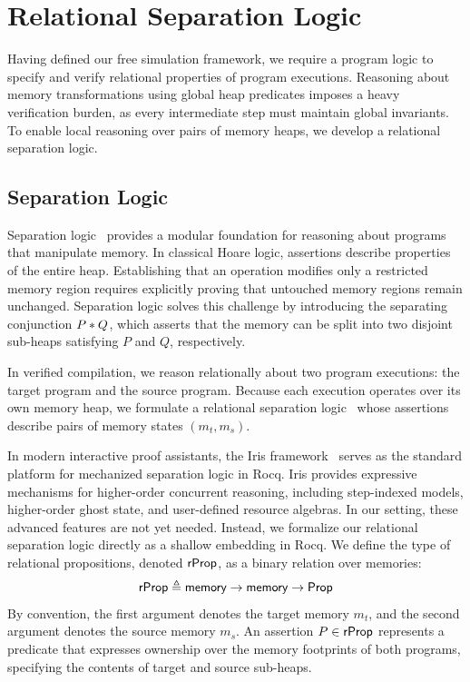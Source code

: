 \documentclass[report.tex]{subfiles}
\begin{document}
\section{Relational Separation Logic}

Having defined our free simulation framework,
we require a program logic to specify and verify relational properties
of program executions.
Reasoning about memory transformations using global heap predicates
imposes a heavy verification burden,
as every intermediate step must maintain global invariants.
To enable local reasoning over pairs of memory heaps,
we develop a relational separation logic.

\subsection{Separation Logic}

Separation logic~\parencites{reynolds-02-sl}{chargueraud-20-sl} provides
a modular foundation for reasoning about programs that manipulate memory.
In classical Hoare logic,
assertions describe properties of the entire heap.
Establishing that an operation modifies only a restricted memory region
requires explicitly proving that untouched memory regions remain unchanged.
Separation logic solves this challenge by introducing
the separating conjunction $P \mathbin{\ast} Q$,
which asserts that the memory can be split into two disjoint sub-heaps
satisfying $P$ and $Q$,
respectively.

In verified compilation,
we reason relationally about two program executions:
the target program and the source program.
Because each execution operates over its own memory heap,
we formulate a relational separation logic~\parencite{yang-07-rsl}
whose assertions describe pairs of memory states $(m_t, m_s)$.

In modern interactive proof assistants,
the Iris framework~\parencite{jung-18-iris,krebbers-17-essence} serves
as the standard platform for mechanized separation logic in Rocq.
Iris provides expressive mechanisms for higher-order concurrent reasoning,
including step-indexed models,
higher-order ghost state,
and user-defined resource algebras.
In our setting,
these advanced features are not yet needed.
Instead,
we formalize our relational separation logic directly
as a shallow embedding in Rocq.
We define the type of relational propositions,
denoted $\textsf{rProp}$,
as a binary relation over memories:
\begin{equation*}
  \textsf{rProp} \triangleq \textsf{memory} \to \textsf{memory} \to \textsf{Prop}
\end{equation*}
By convention,
the first argument denotes the target memory $m_t$,
and the second argument denotes the source memory $m_s$.
An assertion $P \in \textsf{rProp}$ represents a predicate that
expresses ownership over the memory footprints of both programs,
specifying the contents of target and source sub-heaps.
\end{document}
